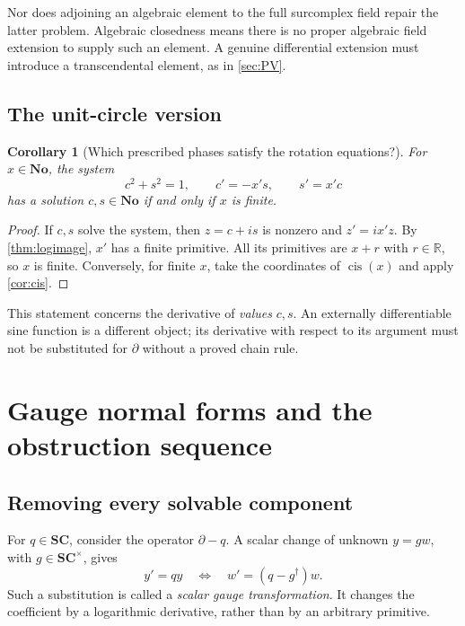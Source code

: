 \documentclass[11pt,letterpaper]{article}
\numberwithin{equation}{section}
\newtheorem{corollary}[corollary]{Corollary}
\theoremstyle{definition}
\theoremstyle{remark}
\newcommand{\No}{\mathbf{No}}
\newcommand{\SC}{\mathbf{SC}}
\newcommand{\R}{\mathbb R}
\newcommand{\der}{\partial}
\newcommand{\cis}{\operatorname{cis}}
\begin{document}
Nor does adjoining an algebraic element to the full surcomplex field repair the latter problem. Algebraic closedness means there is no proper algebraic field extension to supply such an element. A genuine differential extension must introduce a transcendental element, as in \cref{sec:PV}.

\subsection{The unit-circle version}
\begin{corollary}[Which prescribed phases satisfy the rotation equations?]\label{cor:rotation}
For $x\in\No$, the system
\[
 c^2+s^2=1,\qquad c'=-x's,\qquad s'=x'c
\]
has a solution $c,s\in\No$ if and only if $x$ is finite.
\end{corollary}
\begin{proof}
If $c,s$ solve the system, then $z=c+is$ is nonzero and $z'=ix'z$. By \cref{thm:logimage}, $x'$ has a finite primitive. All its primitives are $x+r$ with $r\in\R$, so $x$ is finite. Conversely, for finite $x$, take the coordinates of $\cis(x)$ and apply \cref{cor:cis}.
\end{proof}

This statement concerns the derivative of \emph{values} $c,s$. An externally differentiable sine function is a different object; its derivative with respect to its argument must not be substituted for $\der$ without a proved chain rule.

\section{Gauge normal forms and the obstruction sequence}\label{sec:gauge}

\subsection{Removing every solvable component}
For $q\in\SC$, consider the operator $\der-q$. A scalar change of unknown $y=g w$, with $g\in\SC^\times$, gives
\begin{equation}\label{eq:gauge}
 y'=qy\quad\Longleftrightarrow\quad w'=(q-g^\dagger)w.
\end{equation}
Such a substitution is called a \emph{scalar gauge transformation}. It changes the coefficient by a logarithmic derivative, rather than by an arbitrary primitive.
\end{document}
